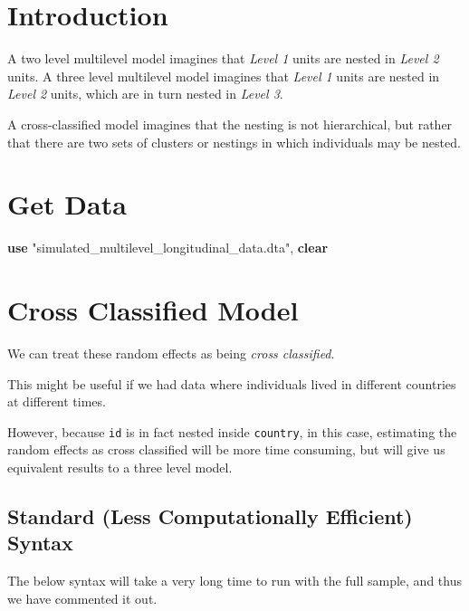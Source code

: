 \documentclass[
  letterpaper,
  DIV=11,
  numbers=noendperiod]{scrreprt}
\newenvironment{Shaded}{\begin{snugshade}}{\end{snugshade}}
\newcommand{\KeywordTok}[1]{\textcolor[rgb]{0.00,0.23,0.31}{\textbf{#1}}}
\newcommand{\NormalTok}[1]{\textcolor[rgb]{0.00,0.23,0.31}{#1}}
\newcommand{\StringTok}[1]{\textcolor[rgb]{0.13,0.47,0.30}{#1}}
\begin{document}
\section{Introduction}\label{introduction-1}

A two level multilevel model imagines that \emph{Level 1} units are
nested in \emph{Level 2} units. A three level multilevel model imagines
that \emph{Level 1} units are nested in \emph{Level 2} units, which are
in turn nested in \emph{Level 3}.

A cross-classified model imagines that the nesting is not hierarchical,
but rather that there are two sets of clusters or nestings in which
individuals may be nested.

\section{Get Data}\label{get-data-2}

\begin{Shaded}
\begin{Highlighting}[]

\KeywordTok{use} \StringTok{"simulated\_multilevel\_longitudinal\_data.dta"}\NormalTok{, }\KeywordTok{clear}
\end{Highlighting}
\end{Shaded}

\section{Cross Classified Model}\label{cross-classified-model}

We can treat these random effects as being \emph{cross classified}.

This might be useful if we had data where individuals lived in different
countries at different times.

However, because \texttt{id} is in fact nested inside \texttt{country},
in this case, estimating the random effects as cross classified will be
more time consuming, but will give us equivalent results to a three
level model.

\subsection{Standard (Less Computationally Efficient)
Syntax}\label{standard-less-computationally-efficient-syntax}

The below syntax will take a very long time to run with the full sample,
and thus we have commented it out.
\end{document}
